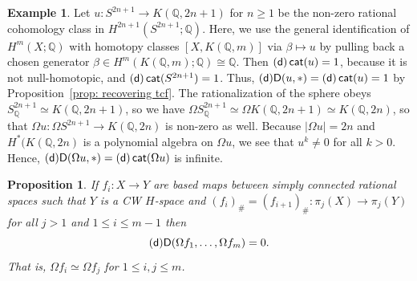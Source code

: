 \documentclass[amscd,amssymb,verbatim,10pt]{amsart}
\numberwithin{equation}{section}
\theoremstyle{plain}
\newtheorem{proposition}[theorem]{Proposition}
\theoremstyle{definition}
\newtheorem{ex}[theorem]{Example}
\DeclareMathOperator{\cat}{{\mathsf{cat}}}
\def\Q{{\mathbb Q}}
\newcommand{\D}{{\sf {D}}}
\newcommand{\sd}{{(\sf {d})}}
\begin{document}
\begin{ex}\label{exam:Dup}
Let $u\colon S^{2n+1} \to K(\Q,2n+1)$ for $n \geq 1$ be the non-zero rational cohomology 
class in $H^{2n+1}(S^{2n+1};\Q)$. Here, we use the general 
identification of $H^m(X;\Q)$ with homotopy classes $[X,K(\Q,m)]$ via $\beta \mapsto u$
by pulling back a chosen generator $\beta\in H^{m}(K(\Q,m);\Q)\cong\Q$. Then 
$\sd\cat(u)=1$, because it is not null-homotopic, and $\sd\cat(S^{2n+1})=1$. 
Thus, $\sd\D(u,*)=\sd\cat(u)=1$ by 
Proposition~\ref{prop: recovering tcf}. The rationalization of the sphere 
obeys $S^{2n+1}_\Q \simeq K(\Q,2n+1)$, so we have $\Omega S^{2n+1}_\Q \simeq 
\Omega K(\Q,2n+1) \simeq K(\Q,2n)$, so that 
$\Omega u\colon \Omega S^{2n+1} \to K(\Q,2n)$ is non-zero as well. Because $|\Omega u|=2n$ and $H^*(K(\Q,2n)$ is a polynomial algebra on $\Omega u$, 
we see that $u^k\not = 0$ for all $k>0$. Hence, $\sd\D(\Omega u,*)=\sd\cat(\Omega u)$ is infinite. 
\end{ex}


\begin{proposition}\label{prop:equalhomo}
If $f_i\colon X \to Y$ are based maps between simply connected rational spaces such that $Y$ is a CW $H$-space and $(f_i)_\#=(f_{i+1})_\#\colon \pi_j(X) \to \pi_j(Y)$ for all $j>1$ and $1\le i \le m-1$
then
\[
\sd\D(\Omega f_1, \dots,\Omega f_m)=0.
\]
That is, $\Omega f_i \simeq \Omega f_j$ for $1\le i,j\le m$.
\end{proposition}
\end{document}
